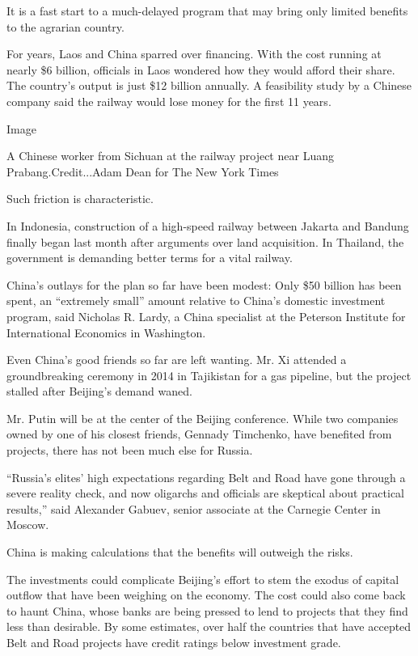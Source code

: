It is a fast start to a much-delayed program that may bring only limited
benefits to the agrarian country.

For years, Laos and China sparred over financing. With the cost running
at nearly \$6 billion, officials in Laos wondered how they would afford
their share. The country's output is just \$12 billion annually. A
feasibility study by a Chinese company said the railway would lose money
for the first 11 years.

Image

A Chinese worker from Sichuan at the railway project near Luang
Prabang.Credit...Adam Dean for The New York Times

Such friction is characteristic.

In Indonesia, construction of a high-speed railway between Jakarta and
Bandung finally began last month after arguments over land acquisition.
In Thailand, the government is demanding better terms for a vital
railway.

China's outlays for the plan so far have been modest: Only \$50 billion
has been spent, an ``extremely small'' amount relative to China's
domestic investment program, said Nicholas R. Lardy, a China specialist
at the Peterson Institute for International Economics in Washington.

Even China's good friends so far are left wanting. Mr. Xi attended a
groundbreaking ceremony in 2014 in Tajikistan for a gas pipeline, but
the project stalled after Beijing's demand waned.

Mr. Putin will be at the center of the Beijing conference. While two
companies owned by one of his closest friends, Gennady Timchenko, have
benefited from projects, there has not been much else for Russia.

``Russia's elites' high expectations regarding Belt and Road have gone
through a severe reality check, and now oligarchs and officials are
skeptical about practical results,'' said Alexander Gabuev, senior
associate at the Carnegie Center in Moscow.

China is making calculations that the benefits will outweigh the risks.

The investments could complicate Beijing's effort to stem the exodus of
capital outflow that have been weighing on the economy. The cost could
also come back to haunt China, whose banks are being pressed to lend to
projects that they find less than desirable. By some estimates, over
half the countries that have accepted Belt and Road projects have credit
ratings below investment grade.

